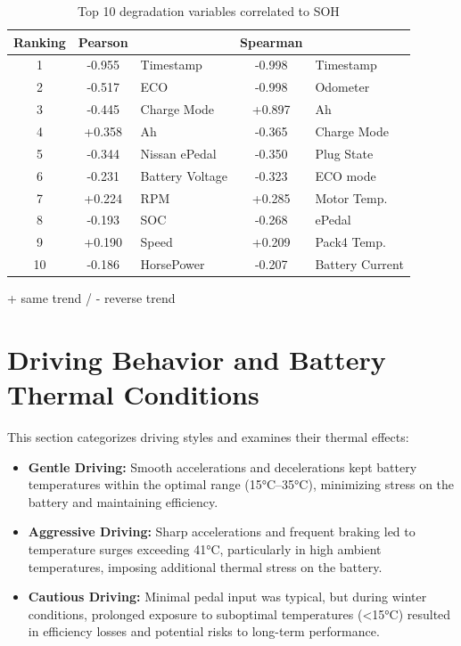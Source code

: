 \begin{table}[!ht]
\centering
\caption{Top 10 degradation variables correlated to SOH}
\begin{tabular}{c|cl|cl}
    \label{table:soh}
    Ranking & Pearson &  & Spearman \\
    \hline
    1 & -0.955 & Timestamp          & -0.998  & Timestamp          \\
    2 & -0.517 & ECO                & -0.998  & Odometer           \\
    3 & -0.445 & Charge Mode        & +0.897  & Ah                \\
    4 & +0.358 & Ah                 & -0.365  & Charge Mode        \\
    5 & -0.344 & Nissan ePedal      & -0.350  & Plug State          \\
    6 & -0.231 & Battery Voltage    & -0.323  & ECO mode            \\
    7 & +0.224 & RPM                & +0.285  & Motor Temp.         \\
    8 & -0.193 & SOC                & -0.268  & ePedal             \\
    9 & +0.190 & Speed              & +0.209  & Pack4 Temp.         \\
    10 & -0.186 & HorsePower        & -0.207  & Battery Current     \\
    \hline
\end{tabular}

\begin{tablenotes}
  \small
  \item + same trend / - reverse trend
\end{tablenotes}
\end{table}

\section{Driving Behavior and Battery Thermal Conditions}

This section categorizes driving styles and examines their thermal effects:

\begin{itemize}
    \item \textbf{Gentle Driving:} Smooth accelerations and decelerations kept battery temperatures within the optimal range (15°C–35°C), minimizing stress on the battery and maintaining efficiency.
    \item \textbf{Aggressive Driving:} Sharp accelerations and frequent braking led to temperature surges exceeding 41°C, particularly in high ambient temperatures, imposing additional thermal stress on the battery.
    \item \textbf{Cautious Driving:} Minimal pedal input was typical, but during winter conditions, prolonged exposure to suboptimal temperatures (<15°C) resulted in efficiency losses and potential risks to long-term performance.
\end{itemize}

